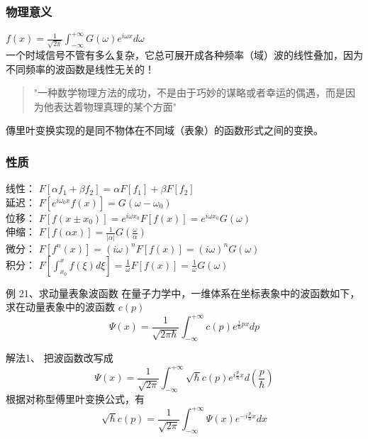 \begin{frame}
	\frametitle{物理意义}
	{\Large   $\displaystyle f(x) =\frac{1}{\sqrt{2\pi}}  \int_{-\infty}^{+\infty}  G(\omega) e^{i\omega x} d\omega $ }\\	\vspace{0.3cm}
	一个时域信号不管有多么复杂，它总可展开成各种频率（域）波的线性叠加，因为不同频率的波函数是线性无关的！	\\ \vspace{0.3cm}
	\begin{quote} \noindent
	"一种数学物理方法的成功，不是由于巧妙的谋略或者幸运的偶遇，而是因为他表达着物理真理的某个方面"
	~~\\
	\end{quote}
	傳里叶变换实现的是同不物体在不同域（表象）的函数形式之间的变换。
\end{frame}

\begin{frame}
	\frametitle{性质 }
    线性： $F[\alpha  f_1 +\beta f_2]=\alpha  F[f_1]+ \beta F[f_2]$ \\ \vspace{0.3cm}
    延迟： $F[e^{i\omega_0x} f(x)] = G(\omega-\omega_0) $ \\ \vspace{0.3cm}
    位移： $F[ f(x\pm x_0)] = e^{i\omega x_0 } F[f(x)]=e^{i\omega x_0 }G(\omega) $ \\ \vspace{0.3cm}
    伸缩： $F[ f(\alpha  x)] = \frac{1}{|\alpha |}G(\frac{\omega}{\alpha }) $ \\ \vspace{0.3cm}
    微分： $F[ f^{n} (x)] = (i\omega ) ^n F[f(x)]= (i\omega )^n G(\omega) $ \\ \vspace{0.3cm}
    积分： $F[ \int_{x_0}^{x}f (\xi) d\xi ] = \frac{1}{\omega}  F[f(x)]=\frac{1}{\omega} G(\omega) $ \\ \vspace{0.3cm}
\end{frame}

\begin{frame}
	\begin{exampleblock} {例 21、求动量表象波函数}
	{在量子力学中，一维体系在坐标表象中的波函数如下，求在动量表象中的波函数 $c(p)$}
		\begin{equation*}
			\Psi(x)=\frac{1}{\sqrt{2\pi \hbar}}  \int_{-\infty}^{+\infty} c(p) e^{\frac{i}{\hbar} px} dp 
		\end{equation*}   	
	\end{exampleblock}
	\alert{解法1、} 把波函数改写成  \\	
	\begin{equation*}
		\Psi(x)= \frac{1}{\sqrt{2\pi }} \int_{-\infty}^{+\infty} \sqrt{\hbar} c(p) e^{i\frac{p}{\hbar} x} d(\frac{p}{\hbar})  
	\end{equation*}     
	根据对称型傅里叶变换公式，有 
	\begin{equation*}
		\sqrt{\hbar} c(p) = \frac{1}{\sqrt{2\pi }} \int_{-\infty}^{+\infty} \Psi(x) e^{-i\frac{p}{\hbar} x} dx
	\end{equation*}   
\end{frame}

